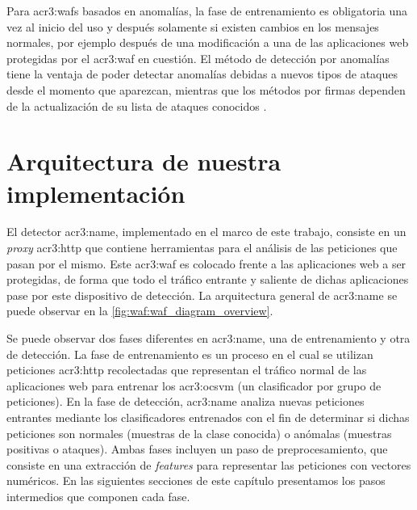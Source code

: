 Para \gls{acr3:waf}s basados en anomalías, la fase de entrenamiento es
obligatoria una vez al inicio del uso y después solamente si existen
cambios en los mensajes normales, por ejemplo después de una modificación
a una de las aplicaciones web protegidas por el \gls{acr3:waf} en cuestión.
El método de detección por anomalías tiene la ventaja de poder detectar
anomalías debidas a nuevos tipos de ataques desde el momento que aparezcan,
mientras que los métodos por firmas dependen de la actualización de su
lista de ataques conocidos
\citep{kruegel2003anomaly}. %


\section{Arquitectura de nuestra implementación}

El detector \gls{acr3:name}, implementado en el marco de este trabajo,
consiste en un \textit{proxy} \gls{acr3:http} que contiene herramientas
para el análisis de las peticiones que pasan por el mismo.
Este \gls{acr3:waf} es colocado frente a las aplicaciones web a ser
protegidas, de forma que todo el tráfico entrante y saliente de dichas
aplicaciones pase por este dispositivo de detección. La arquitectura
general de \gls{acr3:name} se puede observar en la
\autoref{fig:waf:waf_diagram_overview}.

Se puede observar dos fases diferentes en \gls{acr3:name}, una de
entrenamiento y otra de detección. La fase de entrenamiento es un proceso
en el cual se utilizan peticiones \gls{acr3:http} recolectadas que
representan el tráfico normal de las aplicaciones web para entrenar
los \gls{acr3:ocsvm} (un clasificador por grupo de peticiones).
En la fase de detección, \gls{acr3:name} analiza nuevas peticiones
entrantes mediante los clasificadores entrenados con el fin de determinar
si dichas peticiones son normales (muestras de la clase conocida) o
anómalas (muestras positivas o ataques).
Ambas fases incluyen un paso de preprocesamiento, que consiste en una
extracción de \textit{features} para representar las peticiones con
vectores numéricos.
En las siguientes secciones de este capítulo presentamos los pasos
intermedios que componen cada fase.

